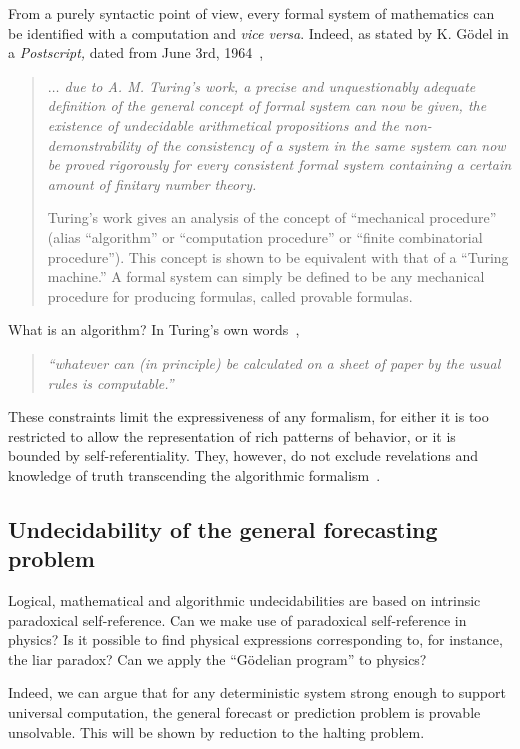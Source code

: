 \documentclass[rmp,amsfonts,showpacs,showkeys,twocolumn]{revtex4}
\begin{document}
From a purely syntactic point of view,
every formal system of mathematics  can be identified with a computation
and {\it vice versa}.
Indeed, as stated by K. G\"odel in a {\sl Postscript,} dated from  June 3rd, 1964~\cite[pp. 369-370]{godel-ges1},
 \begin{quote}
 {\em
 $\ldots $ due to A. M. Turing's work,
 a precise and unquestionably
 adequate definition of the general concept of formal system can now be
 given, the existence of undecidable arithmetical propositions and the
 non-demonstrability of the consistency of a system in the same system
 can now be proved rigorously for {\em every} consistent formal system
 containing a certain amount of finitary number theory.

 Turing's work gives an analysis of the
 concept of ``mechanical
 procedure'' (alias ``algorithm'' or ``computation procedure'' or
 ``finite combinatorial procedure''). This concept is shown to be
 equivalent with that of a ``Turing machine.'' A formal system can
 simply be defined to be any mechanical procedure for producing
 formulas, called provable formulas.}
 \end{quote}

What is an algorithm? In Turing's own words~\cite{turing-36},
 \begin{quote}
{\em
``whatever  can (in principle) be calculated on a
 sheet of paper by  the usual rules is  computable.''}
\end{quote}

These constraints limit the expressiveness of any formalism,
for either it is too restricted to allow the representation of rich patterns of behavior,
or it is bounded by self-referentiality.
They, however, do not exclude revelations
and knowledge of truth transcending the algorithmic formalism~\cite{kreisel-80}.



\subsection{Undecidability of the general forecasting problem}


Logical, mathematical and algorithmic undecidabilities are based on intrinsic paradoxical self-reference.
Can we make use of paradoxical self-reference in physics?
Is it possible to find physical expressions corresponding to,
for instance, the liar paradox?
Can we apply the ``G\"odelian program'' to physics?

Indeed, we can argue that for any deterministic system strong enough to support
universal computation,  the general forecast or prediction
problem is provable unsolvable.
This will be shown by reduction to the halting problem.
\end{document}
